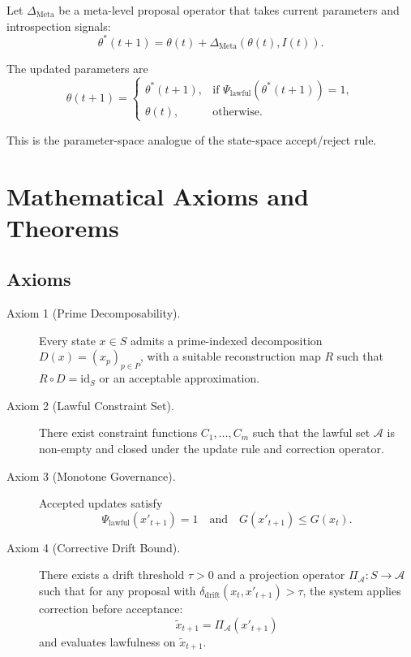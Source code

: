 \documentclass[11pt]{article}
\begin{document}
\begin{definition}
Let \(\Delta_{\mathrm{Meta}}\) be a meta-level proposal operator that takes current parameters and introspection signals:
\[
  \theta^\ast(t+1) = \theta(t) + \Delta_{\mathrm{Meta}}(\theta(t), I(t)).
\]
\end{definition}

\begin{definition}
The updated parameters are
\[
  \theta(t+1) =
  \begin{cases}
    \theta^\ast(t+1), & \text{if } \Psi_{\mathrm{lawful}}(\theta^\ast(t+1)) = 1,\\
    \theta(t), & \text{otherwise.}
  \end{cases}
\]
\end{definition}

This is the parameter-space analogue of the state-space accept/reject rule.

\section{Mathematical Axioms and Theorems}

\subsection{Axioms}

\begin{description}
  \item[Axiom 1 (Prime Decomposability).] Every state \(x \in S\) admits a prime-indexed decomposition \(D(x) = (x_p)_{p \in P}\), with a suitable reconstruction map \(R\) such that \(R \circ D = \mathrm{id}_S\) or an acceptable approximation.
  \item[Axiom 2 (Lawful Constraint Set).] There exist constraint functions \(C_1,\dots,C_m\) such that the lawful set \(\mathcal{A}\) is non-empty and closed under the update rule and correction operator.
  \item[Axiom 3 (Monotone Governance).] Accepted updates satisfy
  \[
    \Psi_{\mathrm{lawful}}(x'_{t+1}) = 1 \quad\text{and}\quad G(x'_{t+1}) \le G(x_t).
  \]
  \item[Axiom 4 (Corrective Drift Bound).] There exists a drift threshold \(\tau > 0\) and a projection operator \(\Pi_{\mathcal{A}} : S \to \mathcal{A}\) such that for any proposal with \(\delta_{\mathrm{drift}}(x_t, x'_{t+1}) > \tau\), the system applies correction before acceptance:
  \[
    \tilde{x}_{t+1} = \Pi_{\mathcal{A}}(x'_{t+1})
  \]
  and evaluates lawfulness on \(\tilde{x}_{t+1}\).
\end{description}
\end{document}
